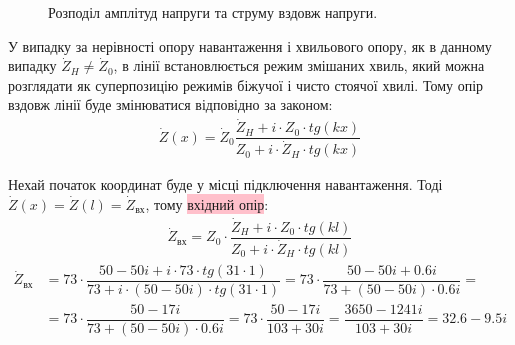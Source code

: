 \documentclass[a4paper,14pt]{extreport}
\begin{document}
\begin{figure}[h]
\caption{Розподіл амплітуд напруги та струму вздовж напруги.}
\label{ris:image1}
\end{figure}


У випадку за нерівності опору навантаження і хвильового опору, як в данному випадку $\dot{Z}_H\neq \dot{Z}_0$, в лінії встановлюється режим змішаних хвиль, який можна розглядати як суперпозицію режимів біжучої і чисто стоячої хвилі. Тому опір вздовж лінії буде змінюватися відповідно за законом:
\begin{align}\label{eq13}
\dot{Z}(x) = \dot{Z}_0\dfrac{\dot{Z}_H + i\cdot Z_0\cdot tg (kx)}{Z_0 + i\cdot \dot{Z}_H\cdot tg (kx)}
\end{align}

Нехай початок координат буде у місці підключення навантаження. Тоді $\dot{Z}(x) = \dot{Z}(l) = \dot{Z}_{\text{вх}}$, тому \colorbox{pink}{вхідний опір}:
\begin{align}\label{eq14}
\dot{Z}_{\text{вх}} = Z_0 \cdot\dfrac{\dot{Z}_H + i\cdot Z_0\cdot tg (kl)}{Z_0 + i\cdot \dot{Z}_H\cdot tg (kl)}
\end{align}
\begin{align*}
\dot{Z}_{\text{вх}} &= 73\cdot \dfrac{50-50i + i\cdot 73\cdot tg (31\cdot 1)}{73 + i\cdot (50-50i)\cdot tg (31\cdot 1)}
 			    = 73\cdot \dfrac{50-50i + 0.6i}{73 + (50-50i)\cdot 0.6i}=\\
			    &= 73\cdot \dfrac{50-17i}{73 + (50-50i)\cdot 0.6i}=73\cdot \dfrac{50-17i}{103 + 30i} = \dfrac{3650-1241i}{103 + 30i} = 32.6 - 9.5i
\end{align*}
\end{document}
